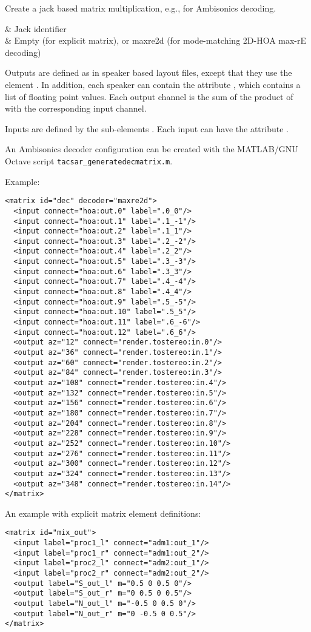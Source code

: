 Create a jack based matrix multiplication, e.g., for Ambisonics decoding.

\begin{tscattributes}
 & Jack identifier\\
 & Empty (for explicit matrix), or maxre2d (for mode-matching 2D-HOA max-rE decoding)\\
\end{tscattributes}

Outputs are defined as in speaker based layout files, except that they
use the element .
%
In addition, each speaker can contain the attribute , which
contains a list of floating point values.
%
Each output channel is the sum of the product of  with the
corresponding input channel.

Inputs are defined by the sub-elements .
%
Each input can have the attribute .

An Ambisonics decoder configuration can be created with the MATLAB/GNU
Octave script \verb!tacsar_generatedecmatrix.m!.

Example:
\begin{lstlisting}[numbers=none]
<matrix id="dec" decoder="maxre2d">
  <input connect="hoa:out.0" label=".0_0"/>
  <input connect="hoa:out.1" label=".1_-1"/>
  <input connect="hoa:out.2" label=".1_1"/>
  <input connect="hoa:out.3" label=".2_-2"/>
  <input connect="hoa:out.4" label=".2_2"/>
  <input connect="hoa:out.5" label=".3_-3"/>
  <input connect="hoa:out.6" label=".3_3"/>
  <input connect="hoa:out.7" label=".4_-4"/>
  <input connect="hoa:out.8" label=".4_4"/>
  <input connect="hoa:out.9" label=".5_-5"/>
  <input connect="hoa:out.10" label=".5_5"/>
  <input connect="hoa:out.11" label=".6_-6"/>
  <input connect="hoa:out.12" label=".6_6"/>
  <output az="12" connect="render.tostereo:in.0"/>
  <output az="36" connect="render.tostereo:in.1"/>
  <output az="60" connect="render.tostereo:in.2"/>
  <output az="84" connect="render.tostereo:in.3"/>
  <output az="108" connect="render.tostereo:in.4"/>
  <output az="132" connect="render.tostereo:in.5"/>
  <output az="156" connect="render.tostereo:in.6"/>
  <output az="180" connect="render.tostereo:in.7"/>
  <output az="204" connect="render.tostereo:in.8"/>
  <output az="228" connect="render.tostereo:in.9"/>
  <output az="252" connect="render.tostereo:in.10"/>
  <output az="276" connect="render.tostereo:in.11"/>
  <output az="300" connect="render.tostereo:in.12"/>
  <output az="324" connect="render.tostereo:in.13"/>
  <output az="348" connect="render.tostereo:in.14"/>
</matrix>
\end{lstlisting}

An example with explicit matrix element definitions:
\begin{lstlisting}[numbers=none]
<matrix id="mix_out">
  <input label="proc1_l" connect="adm1:out_1"/>
  <input label="proc1_r" connect="adm1:out_2"/>
  <input label="proc2_l" connect="adm2:out_1"/>
  <input label="proc2_r" connect="adm2:out_2"/>
  <output label="S_out_l" m="0.5 0 0.5 0"/>
  <output label="S_out_r" m="0 0.5 0 0.5"/>
  <output label="N_out_l" m="-0.5 0 0.5 0"/>
  <output label="N_out_r" m="0 -0.5 0 0.5"/>
</matrix>
\end{lstlisting}
